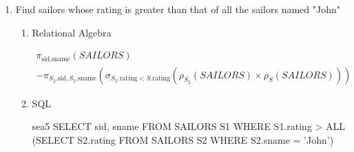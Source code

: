\begin{enumerate}
\begin{enumerate}
                        \begin{equation*}
                              \pi_{\text{sid}} - \pi_{\text{sid}}(SAILORS \bowtie \sigma_{\text{date\_of\_birth}\; >\; \text{Jan 2018}}(RESERVES))
                        \end{equation*}

                  \item SQL
                        \begin{sqlQuery}{sea4}
                    SELECT sid FROM SAILORS 
                    WHERE sid NOT IN 
                        (SELECT sid FROM RESERVES 
                        WHERE date_of_birth > '2018-01-01')
                    \end{sqlQuery}

                  \item Output
                        \begin{lstlisting}[style=output]
practicals=# \i /home/sql/sea4.sql
sid
-----
3
4
5
(3 rows)
                        \end{lstlisting}

            \end{enumerate}

      \item  Find sailors whose rating is greater than that of all the sailors named "John"
            \begin{enumerate}
                  \item Relational Algebra

                        \begin{multline*}
                              \pi_{\text{sid}, \text{sname}}(SAILORS) \\
                              - \pi_{S_2.\text{sid},S_2.\text{sname}}(\sigma_{S_2.\text{rating} < S.\text{rating}}(\rho_{S_2}(SAILORS)\times \rho_S(SAILORS)))
                        \end{multline*}

                  \item SQL

                        \begin{sqlQuery}{sea5}
                        SELECT sid, sname FROM SAILORS S1
                        WHERE S1.rating > ALL
                                (SELECT S2.rating FROM SAILORS S2
                                WHERE S2.sname = 'John')
                    \end{sqlQuery}


\end{enumerate}
\end{enumerate}
